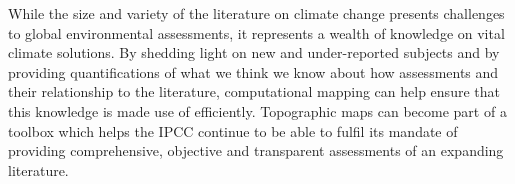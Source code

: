 \documentclass{article}
\begin{document}
\begin{linenumbers}
		While the size and variety of the literature on climate change presents challenges to global environmental assessments, it represents a wealth of knowledge on vital climate solutions. By shedding light on new and under-reported subjects and by providing quantifications of what we think we know about how assessments and their relationship to the literature, computational mapping can help ensure that this knowledge is made use of efficiently.  Topographic maps  can become part of a toolbox which helps the IPCC continue to be able to fulfil its mandate of providing comprehensive, objective and transparent assessments of an expanding literature.
		
	\end{linenumbers}
	
	\appendix
	
	\linespread{1}
\end{document}

